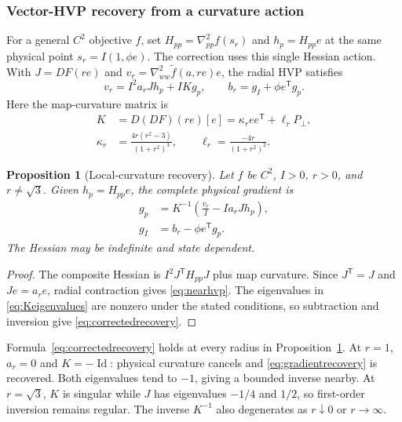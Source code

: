 \documentclass[10pt,a4paper]{article}
\newtheorem{proposition}[theorem]{Proposition}
\begin{document}
\subsubsection{Vector-HVP recovery from a curvature action}
For a general $C^2$ objective $f$, set $H_{pp}=\nabla^2_{pp}f(s_r)$ and $h_p=H_{pp}e$ at the same physical point $s_r=I(1,\phi e)$. The correction uses this single Hessian action. With $J=DF(re)$ and $v_r=\nabla^2_{ww}\widetilde f(a,re)e$, the radial HVP satisfies
\begin{equation}
 v_r=I^2a_rJ h_p+IKg_p,\qquad
 b_r=g_I+\phi e^{\mathsf T}g_p.
 \label{eq:nearhvp}
\end{equation}
Here the map-curvature matrix is
\begin{equation}
 \begin{aligned}
 K&=D(DF)(re)[e]=\kappa_r ee^{\mathsf T}+\ell_rP_\perp,\\
 \kappa_r&=\frac{4r(r^2-3)}{(1+r^2)^3},\qquad
 \ell_r=\frac{-4r}{(1+r^2)^2}.
 \end{aligned}
 \label{eq:Keigenvalues}
\end{equation}
\begin{proposition}[Local-curvature recovery]
\label{prop:localcurvature}
Let $f$ be $C^2$, $I>0$, $r>0$, and $r\ne\sqrt3$. Given $h_p=H_{pp}e$, the complete physical gradient is
\begin{equation}
 \begin{aligned}
 g_p&=K^{-1}\left(\frac{v_r}{I}-Ia_rJ h_p\right),\\
 g_I&=b_r-\phi e^{\mathsf T}g_p.
 \end{aligned}
 \label{eq:correctedrecovery}
\end{equation}
The Hessian may be indefinite and state dependent.
\end{proposition}
\begin{proof}
The composite Hessian is $I^2J^{\mathsf T}H_{pp}J$ plus map curvature. Since $J^{\mathsf T}=J$ and $Je=a_re$, radial contraction gives \eqref{eq:nearhvp}. The eigenvalues in \eqref{eq:Keigenvalues} are nonzero under the stated conditions, so subtraction and inversion give \eqref{eq:correctedrecovery}.
\end{proof}
Formula~\eqref{eq:correctedrecovery} holds at every radius in Proposition~\ref{prop:localcurvature}. At $r=1$, $a_r=0$ and $K=-\operatorname{Id}$: physical curvature cancels and \eqref{eq:gradientrecovery} is recovered. Both eigenvalues tend to $-1$, giving a bounded inverse nearby. At $r=\sqrt3$, $K$ is singular while $J$ has eigenvalues $-1/4$ and $1/2$, so first-order inversion remains regular. The inverse $K^{-1}$ also degenerates as $r\downarrow0$ or $r\to\infty$.
\end{document}
